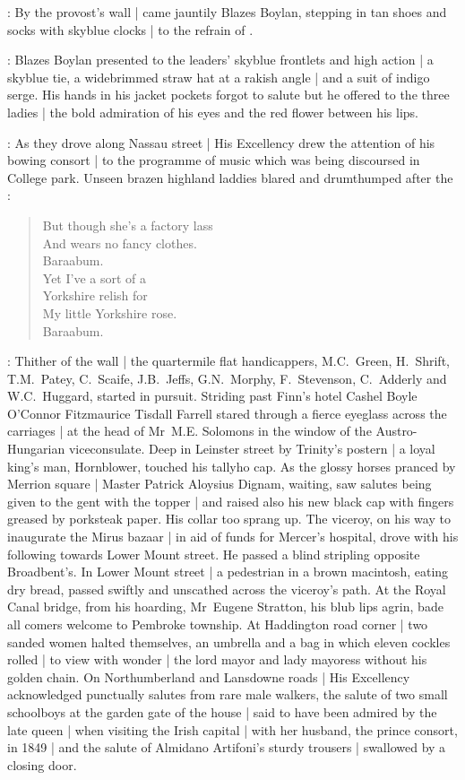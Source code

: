 :
By the provost's wall |
came jauntily Blazes Boylan,
stepping in tan shoes
and socks with skyblue clocks |
to the refrain of
.

:
Blazes Boylan presented to the leaders' skyblue frontlets and high action |
a skyblue tie,
a widebrimmed straw hat at a rakish angle |
and a suit of indigo serge.
His hands in his jacket pockets forgot to salute 
but he offered to the three ladies |
the bold admiration of his eyes
and the red flower between his lips.

:
As they drove along Nassau street |
His Excellency
drew the attention of his bowing consort |
to the programme of music
which was being discoursed in College park.
Unseen brazen highland laddies
blared and drumthumped
after the :%


\begin{verse}
    But though she's a factory lass \\
    And wears no fancy clothes. \\
    Baraabum. \\
    Yet I've a sort of a \\
    Yorkshire relish for \\
    My little Yorkshire rose. \\
    Baraabum.
\end{verse}

:
Thither of the wall |
the quartermile flat handicappers,
M.C.~Green,
H.~Shrift,
T.M.~Patey,
C.~Scaife,
J.B.~Jeffs,
G.N.~Morphy,
F.~Stevenson,
C.~Adderly
and W.C.~Huggard,
started in pursuit.%
Striding past Finn's hotel
Cashel Boyle O'Connor Fitzmaurice Tisdall Farrell
stared through a fierce eyeglass
across the carriages |
at the head of Mr~M.E. Solomons
in the window of the Austro-Hungarian viceconsulate.
Deep in Leinster street
by Trinity's postern |
a loyal king's man, Hornblower,
touched his tallyho cap.
As the glossy horses pranced by Merrion square |
Master Patrick Aloysius Dignam, waiting,
saw salutes being given to the gent with the topper |
and raised also his new black cap
with fingers greased by porksteak paper.
His collar too sprang up.
The viceroy,
on his way to inaugurate the Mirus bazaar |
in aid of funds for Mercer's hospital,%
drove with his following
towards Lower Mount street.
He passed a blind stripling opposite Broadbent's.
In Lower Mount street |
a pedestrian in a brown macintosh,
eating dry bread,
passed swiftly and unscathed across the viceroy's path.
At the Royal Canal bridge,
from his hoarding,
Mr~Eugene Stratton,
his blub lips agrin,
bade all comers welcome to Pembroke township.
At Haddington road corner |
two sanded women halted themselves,
an umbrella and a bag in which eleven cockles rolled |
to view with wonder |
the lord mayor and lady mayoress without his golden chain.
On Northumberland and Lansdowne roads |
His Excellency acknowledged punctually
salutes from rare male walkers,
the salute of two small schoolboys
at the garden gate of the house |
said to have been admired by the late queen |
when visiting the Irish capital |
with her husband, the prince consort, in 1849 |
and the salute of Almidano Artifoni's sturdy trousers |
swallowed by a closing door.
